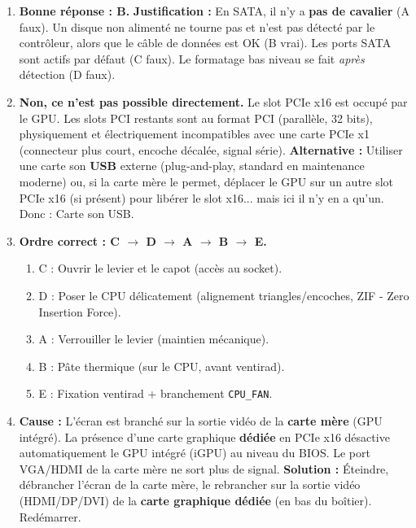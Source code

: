 \documentclass[11pt]{article}
\begin{document}
\begin{corrige}[Exercice n]
\begin{enumerate}
\item \textbf{Bonne réponse : B.}
\textbf{Justification :} En SATA, il n'y a \textbf{pas de cavalier} (A faux). Un disque non alimenté ne tourne pas et n'est pas détecté par le contrôleur, alors que le câble de données est OK (B vrai). Les ports SATA sont actifs par défaut (C faux). Le formatage bas niveau se fait \emph{après} détection (D faux).
\item \textbf{Non, ce n'est pas possible directement.} Le slot PCIe x16 est occupé par le GPU. Les slots PCI restants sont au format PCI (parallèle, 32 bits), physiquement et électriquement incompatibles avec une carte PCIe x1 (connecteur plus court, encoche décalée, signal série).
\textbf{Alternative :} Utiliser une carte son \textbf{USB} externe (plug-and-play, standard en maintenance moderne) ou, si la carte mère le permet, déplacer le GPU sur un autre slot PCIe x16 (si présent) pour libérer le slot x16... mais ici il n'y en a qu'un. Donc : Carte son USB.
\item \textbf{Ordre correct : C $\rightarrow$ D $\rightarrow$ A $\rightarrow$ B $\rightarrow$ E.}
\begin{enumerate}
\item C : Ouvrir le levier et le capot (accès au socket).
\item D : Poser le CPU délicatement (alignement triangles/encoches, ZIF - Zero Insertion Force).
\item A : Verrouiller le levier (maintien mécanique).
\item B : Pâte thermique (sur le CPU, avant ventirad).
\item E : Fixation ventirad + branchement \texttt{CPU\_FAN}.
\end{enumerate}
\item \textbf{Cause :} L'écran est branché sur la sortie vidéo de la \textbf{carte mère} (GPU intégré). La présence d'une carte graphique \textbf{dédiée} en PCIe x16 désactive automatiquement le GPU intégré (iGPU) au niveau du BIOS. Le port VGA/HDMI de la carte mère ne sort plus de signal.
\textbf{Solution :} Éteindre, débrancher l'écran de la carte mère, le rebrancher sur la sortie vidéo (HDMI/DP/DVI) de la \textbf{carte graphique dédiée} (en bas du boîtier). Redémarrer.
\end{enumerate}
\end{corrige}

\newpage
\end{document}
